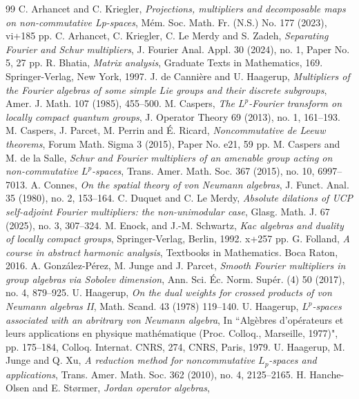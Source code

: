 \documentclass[12pt]{amsart}
\theoremstyle{remark}
\theoremstyle{definition}
\numberwithin{equation}{section}
\begin{document}
	
\begin{thebibliography}{99}
 C. Arhancet and C. Kriegler, {\it Projections, multipliers and decomposable maps on non-commutative Lp-spaces},
Mém. Soc. Math. Fr. (N.S.) No. 177 (2023), vi+185 pp.
  C. Arhancet, C. Kriegler, C. Le Merdy and S. Zadeh, {\it Separating Fourier and Schur multipliers},
J. Fourier Anal. Appl. 30 (2024), no. 1, Paper No. 5, 27 pp.
  R. Bhatia, {\it Matrix analysis},
Graduate Texts in Mathematics, 169. Springer-Verlag, New York, 1997. 
 J. de Canni\`ere and U. Haagerup, {\it Multipliers of the Fourier algebras of some simple Lie 
groups and their discrete subgroups},
 Amer. J. Math. 107 (1985), 455--500. 
 M. Caspers, {\it  The $L^p$-Fourier transform on locally compact quantum groups},
J. Operator Theory 69 (2013), no. 1, 161–193.
 M. Caspers, J. Parcet, M. Perrin and  É. Ricard,
{\it Noncommutative de Leeuw theorems},
Forum Math. Sigma 3 (2015), Paper No. e21, 59 pp. 
 M. Caspers and M. de la Salle,
{\it Schur and Fourier multipliers of an amenable group acting on non-commutative $L^p$-spaces},
Trans. Amer. Math. Soc. 367 (2015), no. 10, 6997–7013.
 A. Connes, {\it On the spatial theory of von Neumann algebras},
 J. Funct. Anal.  35 (1980), no. 2, 153–164.
 C. Duquet and C. Le Merdy,  {\it
Absolute dilations of UCP self-adjoint Fourier multipliers: the non-unimodular case},
Glasg. Math. J. 67 (2025), no. 3, 307–324. 
 M. Enock,  and J.-M. Schwartz, 
{\it Kac algebras and duality of locally compact groups}, 
Springer-Verlag, Berlin, 1992. x+257 pp.
 G. Folland, {\it A course in abstract harmonic analysis}, 
Textbooks in Mathematics. Boca Raton, 2016.
  A. González-Pérez,  M. Junge and J. Parcet,
{\it Smooth Fourier multipliers in group algebras via Sobolev dimension}, 
Ann. Sci. Éc. Norm. Supér. (4) 50 (2017), no. 4, 879–925.
 U. Haagerup, {\it On the dual weights for crossed products of von Neumann algebras II}, Math. Scand. 43 (1978) 119–140.
 U. Haagerup, {\it $L^p$-spaces associated with an abritrary 
von Neumann algebra},  In ``Algèbres d'opérateurs et leurs applications en physique mathématique 
(Proc. Colloq., Marseille, 1977)", pp. 175–184, Colloq. Internat. CNRS, 274, CNRS, Paris, 1979. 
  U. Haagerup, M. Junge and Q. Xu, 
{\it A reduction method for noncommutative $L_p$-spaces and applications},
Trans. Amer. Math. Soc. 362 (2010), no. 4, 2125–2165. 
 H. Hanche-Olsen and E. St\o{}rmer, {\it Jordan operator algebras}, 

\end{thebibliography}
\end{document}
